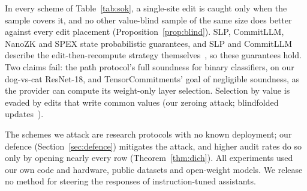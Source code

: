 In every scheme of Table~\ref{tab:sok}, a single-site edit is caught only when the sample covers
it, and no other value-blind sample of the same size does better against every edit
placement (Proposition~\ref{prop:blind}). SLP, CommitLLM,
NanoZK and SPEX state probabilistic guarantees, and SLP and CommitLLM describe the
edit-then-recompute strategy themselves~\cite{slp,commitllm2026}, so these guarantees hold. Two
claims fail: the path protocol's full soundness for binary classifiers, on our dog-vs-cat
ResNet-18, and \mbox{TensorCommitments'} goal of negligible soundness, as the provider can compute its
weight-only layer selection. Selection by value is evaded by edits that write common values (our
zeroing attack; blindfolded updates~\cite{fang2023pol}).

 The schemes we attack are research protocols with no known
deployment; our defence (Section~\ref{sec:defence}) mitigates the attack, and higher audit rates do
so only by opening nearly every row (Theorem~\ref{thm:dich}). All experiments used our own code and
hardware, public datasets and open-weight models. We release no method for steering the responses of
instruction-tuned assistants.
